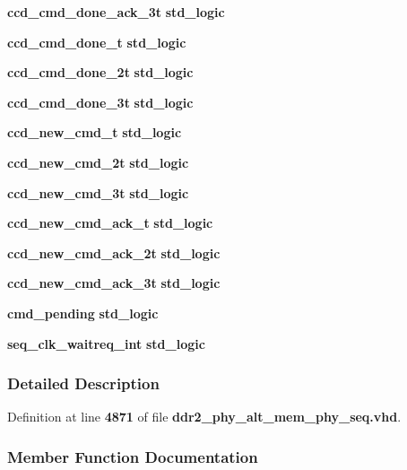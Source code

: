 \begin{DoxyCompactItemize}
\item 
{\bf ccd\+\_\+cmd\+\_\+done\+\_\+ack\+\_\+3t} {\bfseries \textcolor{comment}{std\+\_\+logic}\textcolor{vhdlchar}{ }} 
\item 
{\bf ccd\+\_\+cmd\+\_\+done\+\_\+t} {\bfseries \textcolor{comment}{std\+\_\+logic}\textcolor{vhdlchar}{ }} 
\item 
{\bf ccd\+\_\+cmd\+\_\+done\+\_\+2t} {\bfseries \textcolor{comment}{std\+\_\+logic}\textcolor{vhdlchar}{ }} 
\item 
{\bf ccd\+\_\+cmd\+\_\+done\+\_\+3t} {\bfseries \textcolor{comment}{std\+\_\+logic}\textcolor{vhdlchar}{ }} 
\item 
{\bf ccd\+\_\+new\+\_\+cmd\+\_\+t} {\bfseries \textcolor{comment}{std\+\_\+logic}\textcolor{vhdlchar}{ }} 
\item 
{\bf ccd\+\_\+new\+\_\+cmd\+\_\+2t} {\bfseries \textcolor{comment}{std\+\_\+logic}\textcolor{vhdlchar}{ }} 
\item 
{\bf ccd\+\_\+new\+\_\+cmd\+\_\+3t} {\bfseries \textcolor{comment}{std\+\_\+logic}\textcolor{vhdlchar}{ }} 
\item 
{\bf ccd\+\_\+new\+\_\+cmd\+\_\+ack\+\_\+t} {\bfseries \textcolor{comment}{std\+\_\+logic}\textcolor{vhdlchar}{ }} 
\item 
{\bf ccd\+\_\+new\+\_\+cmd\+\_\+ack\+\_\+2t} {\bfseries \textcolor{comment}{std\+\_\+logic}\textcolor{vhdlchar}{ }} 
\item 
{\bf ccd\+\_\+new\+\_\+cmd\+\_\+ack\+\_\+3t} {\bfseries \textcolor{comment}{std\+\_\+logic}\textcolor{vhdlchar}{ }} 
\item 
{\bf cmd\+\_\+pending} {\bfseries \textcolor{comment}{std\+\_\+logic}\textcolor{vhdlchar}{ }} 
\item 
{\bf seq\+\_\+clk\+\_\+waitreq\+\_\+int} {\bfseries \textcolor{comment}{std\+\_\+logic}\textcolor{vhdlchar}{ }} 
\end{DoxyCompactItemize}


\subsubsection{Detailed Description}


Definition at line {\bf 4871} of file {\bf ddr2\+\_\+phy\+\_\+alt\+\_\+mem\+\_\+phy\+\_\+seq.\+vhd}.



\subsubsection{Member Function Documentation}
